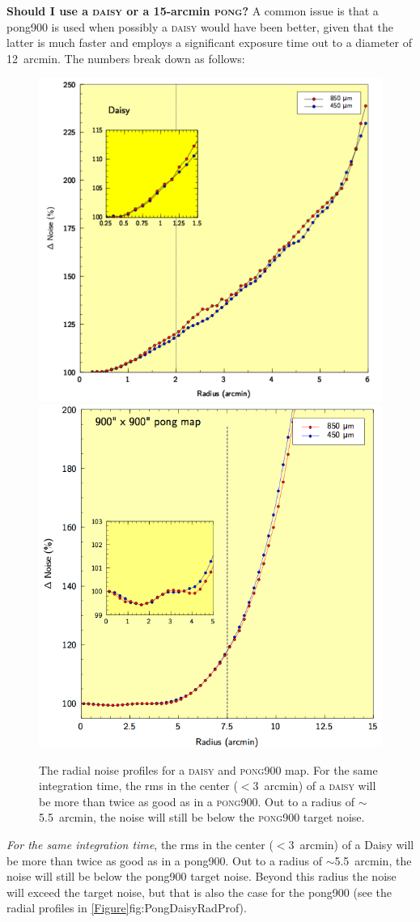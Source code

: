 \textbf{Should I use a \textsc{daisy} or a 15-arcmin \textsc{pong}?}  A
common issue is that a pong900 is used when possibly
a \textsc{daisy} would have been better, given that the latter is much faster and employs a significant
exposure time out to a diameter of 12~arcmin. The numbers break down as follows:

\begin{figure}
\includegraphics[width=0.47\linewidth]{sc21_DaisyRadProf.png}
\hspace{3mm}
\includegraphics[width=0.445\linewidth]{sc21_Pong900RadProf.png}
\caption[Radial noise profiles for \textsc{Daisy} and \textsc{pong} maps.]{The
radial noise profiles for a \textsc{daisy} and \textsc{pong900} map. For the same integration time, the rms in the center ($<$3~arcmin) of a \textsc{daisy} will be more than twice as good as in a \textsc{pong900}. Out to a radius of $\sim$5.5~arcmin, the noise will still be below the \textsc{pong900} target noise.}
\label{fig:PongDaisyRadProf}
\end{figure}

\vspace{5mm}

\textit{For the same integration time}, the rms in the center ($<$3~arcmin) of a Daisy will be more than twice as good as in a pong900. Out to a radius of $\sim$5.5~arcmin, the noise will still be below the pong900 target noise. Beyond this radius the noise will exceed the target noise, but that is also the case for the pong900 (see the radial profiles in
\cref{Figure}{fig:PongDaisyRadProf}{}).

